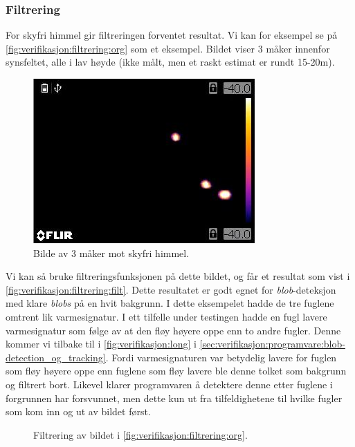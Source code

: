 \subsubsection{Filtrering}\label{sec:verifikasjon:programvare:filtrering}
For skyfri himmel gir filtreringen forventet resultat. 
Vi kan for eksempel se på \autoref{fig:verifikasjon:filtrering:org} som et eksempel. 
Bildet viser 3 måker innenfor synsfeltet, alle i lav høyde (ikke målt, men et raskt estimat er rundt 15-20m).

\begin{figure}[H]
    \centering
    \includegraphics[width=.5\textwidth]{verifikasjon-test/Tracking_ex/org1.JPG}
    \caption{Bilde av 3 måker mot skyfri himmel.}
    \label{fig:verifikasjon:filtrering:org}
\end{figure}

Vi kan så bruke filtreringsfunksjonen på dette bildet, og får et resultat som vist i \autoref{fig:verifikasjon:filtrering:filt}.
Dette resultatet er godt egnet for \textit{blob}-deteksjon med klare \textit{blobs} på en hvit bakgrunn. I dette eksempelet hadde de tre fuglene omtrent lik varmesignatur. I ett tilfelle under testingen hadde en fugl lavere varmesignatur som følge av at den fløy høyere oppe enn to andre fugler. Denne kommer vi tilbake til i \autoref{fig:verifikasjon:long} i \autoref{sec:verifikasjon:programvare:blob-detection_og_tracking}. Fordi varmesignaturen var betydelig lavere for fuglen som fløy høyere oppe enn fuglene som fløy lavere ble denne tolket som bakgrunn og filtrert bort. Likevel klarer programvaren å detektere denne etter fuglene i forgrunnen har forsvunnet, men dette kun ut fra tilfeldighetene til hvilke fugler som kom inn og ut av bildet først.

\begin{figure}[H]
    \centering
    \caption{Filtrering av bildet i \autoref{fig:verifikasjon:filtrering:org}.}
    \label{fig:verifikasjon:filtrering:filt}
\end{figure}

